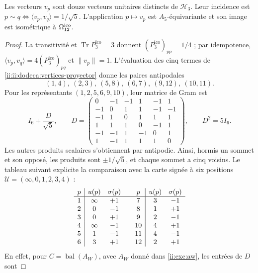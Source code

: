 \begin{proposition}
\label{ii:ii:dodeca:realizacion}
Les vecteurs \(v_p\) sont douze vecteurs unitaires distincts de
\(\mathcal H_3\). Leur incidence est
\(p\sim q\Longleftrightarrow\langle v_p,v_q\rangle=1/\sqrt5\).
L’application \(p\mapsto v_p\) est \(A_5\)-équivariante et son image
est isométrique à \(\Omega_{12}^{\rm ico}\).
\end{proposition}
\begin{proof}
La transitivité et \(\operatorname{Tr}P_3^{\mathrm{ico}}=3\) donnent
\((P_3^{\mathrm{ico}})_{pp}=1/4\) ; par idempotence,
\(\langle v_p,v_q\rangle=4(P_3^{\mathrm{ico}})_{pq}\) et \(\|v_p\|=1\).
L’évaluation des cinq termes de
\eqref{ii:ii:dodeca:vertices-proyector} donne les paires antipodales
\[
 (1,4),\ (2,3),\ (5,8),\ (6,7),\ (9,12),\ (10,11).
\]
Pour les représentants \((1,2,5,6,9,10)\), leur matrice de Gram est
\begin{equation}
 I_6+\frac D{\sqrt5},\qquad
 D=\begin{pmatrix}
 0&-1&-1&1&-1&1\\
 -1&0&1&1&-1&-1\\
 -1&1&0&1&1&1\\
 1&1&1&0&-1&1\\
 -1&-1&1&-1&0&1\\
 1&-1&1&1&1&0
 \end{pmatrix},\qquad D^2=5I_6.
 \label{ii:ii:dodeca:gram}
\end{equation}
Les autres produits scalaires s’obtiennent par antipodie.
Ainsi, hormis un sommet et son opposé, les produits sont
\(\pm1/\sqrt5\), et chaque sommet a cinq voisins. Le tableau suivant
explicite la comparaison avec la carte signée à six positions
\(\mathcal U=(\infty,0,1,2,3,4)\) :
\begin{equation}
\begin{array}{c|cc@{\qquad}c|cc}
p&u(p)&\sigma(p)&p&u(p)&\sigma(p)\\ \hline
1&\infty&+1&7&3&-1\\
2&0&-1&8&1&+1\\
3&0&+1&9&2&-1\\
4&\infty&-1&10&4&+1\\
5&1&-1&11&4&-1\\
6&3&+1&12&2&+1
\end{array}
\label{ii:ii:dodeca:carta-firmada}
\end{equation}
En effet, pour \(C=\operatorname{bal}(A_W)\), avec \(A_W\) donné dans
\eqref{ii:exc:aw}, les entrées de \(D\) sont

\end{proof}
